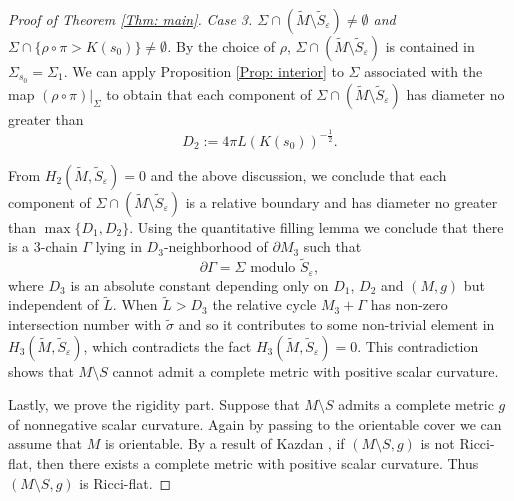 \documentclass[11pt, reqno]{amsart}
\numberwithin{equation}{section}
\theoremstyle{definition}
\newcommand{\ve}{\varepsilon}
\begin{document}
\begin{proof}[Proof of Theorem \ref{Thm: main}]
\medskip

{\it Case 3. $\Sigma\cap (\tilde M\setminus \tilde S_\ve)\neq \emptyset$ and $\Sigma\cap \{\rho\circ \pi > K(s_0)\}\neq \emptyset$.} By the choice of $\rho$, $\Sigma\cap (\tilde M\setminus \tilde S_\ve)$ is contained in $\Sigma_{s_0} =\Sigma_1$. We can apply Proposition \ref{Prop: interior} to $\Sigma$ associated with the map $(\rho\circ\pi)|_\Sigma$ to obtain that each component of $\Sigma\cap (\tilde M\setminus \tilde S_\ve)$ has diameter no greater than
$$
D_2:=4\pi L(K(s_0))^{-\frac{1}{2}}.
$$

\medskip

From $H_2(\tilde M,\tilde S_\ve)=0$ and the above discussion, we conclude that each component of $\Sigma\cap (\tilde M\setminus \tilde S_\ve)$ is a relative boundary and has diameter no greater than $\max\{D_{1},D_{2}\}$. Using the quantitative filling lemma \cite[Lemma 2.8]{CCZ23} we conclude that there is a $3$-chain $\Gamma$ lying in $D_3$-neighborhood of $\partial M_3$ such that
$$
\partial\Gamma=\Sigma\mbox{ modulo }\tilde S_\ve,
$$
where $D_3$ is an absolute constant depending only on $D_1$, $D_2$ and $(M,g)$ but independent of $\tilde L$. When $\tilde L>D_3$ the relative cycle $M_3+\Gamma$ has non-zero intersection number with $\tilde \sigma$ and so it contributes to some non-trivial element in $H_3(\tilde M,\tilde S_\ve)$, which contradicts the fact $H_3(\tilde M,\tilde S_\ve)=0$. This contradiction shows that $M\setminus S$ cannot admit a complete metric with positive scalar curvature.

\medskip

Lastly, we prove the rigidity part. Suppose that $M\setminus S$ admits a complete metric $g$ of nonnegative scalar curvature. Again by passing to the orientable cover we can assume that $M$ is orientable. By a result of Kazdan \cite{Kaz82}, if $(M\setminus S,g)$ is not Ricci-flat, then there exists a complete metric with positive scalar curvature. Thus $(M\setminus S,g)$ is Ricci-flat.


\end{proof}
\end{document}
